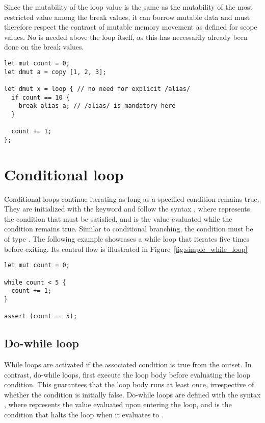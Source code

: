 Since the mutability of the loop value is the same as the mutability of the most
restricted value among the break values, it can borrow mutable data and must
therefore respect the contract of mutable memory movement as defined for scope
values. No  is needed above the loop itself, as this has
necessarily already been done on the break values.

\begin{lstlisting}[style=coloredverbatim, escapechar=@]
let mut count = 0;
let dmut a = copy [1, 2, 3];

let dmut x = loop { // no need for explicit /alias/
  if count == 10 {
    break alias a; // /alias/ is mandatory here
  }

  count += 1;
};
\end{lstlisting}

\vfill%
\pagebreak

\section{Conditional loop}%
\label{sec:while_loop}

Conditional loops continue iterating as long as a specified condition remains
true. They are initialized with the keyword  and follow the syntax
, where  represents the condition that must be
satisfied, and  is the value evaluated while the condition remains
true. Similar to conditional branching, the condition  must be of type
. The following example showcases a while loop that iterates five
times before exiting. Its control flow is illustrated in
Figure~\ref{fig:simple_while_loop}

\begin{lstlisting}[style=coloredverbatim, caption=Simple while loop, label=lst:simple_while_loop]
let mut count = 0;

while count < 5 {
  count += 1;
}

assert (count == 5);
\end{lstlisting}



\subsection{Do-while loop}
\label{sec:do_while_loop}

While loops are activated if the associated condition is true from the outset.
In contrast, do-while loops, first execute the loop body before evaluating the
loop condition. This guarantees that the loop body runs at least once,
irrespective of whether the condition is initially false. Do-while loops are
defined with the syntax , where  represents the
value evaluated upon entering the loop, and  is the condition that
halts the loop when it evaluates to .

